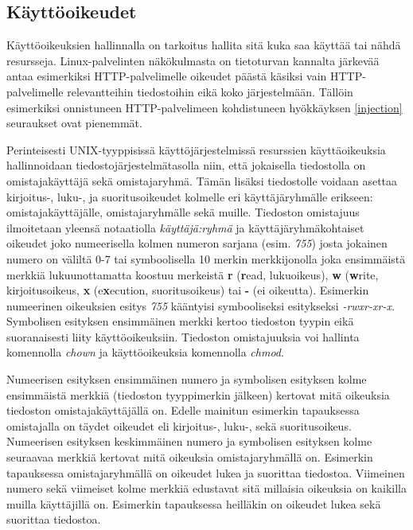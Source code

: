 \subsection{Käyttöoikeudet}\label{access_rights}
Käyttöoikeuksien hallinnalla on tarkoitus hallita sitä kuka saa käyttää tai nähdä resursseja. Linux-palvelinten näkökulmasta on tietoturvan kannalta järkevää antaa esimerkiksi HTTP-palvelimelle oikeudet päästä käsiksi vain HTTP-palvelimelle relevantteihin tiedostoihin eikä koko järjestelmään. Tällöin esimerkiksi onnistuneen HTTP-palvelimeen kohdistuneen hyökkäyksen \ref{injection} seuraukset ovat pienemmät.

Perinteisesti UNIX-tyyppisissä käyttöjärjestelmissä resurssien käyttäoikeuksia hallinnoidaan tiedostojärjestelmätasolla niin, että jokaisella tiedostolla on omistajakäyttäjä sekä omistajaryhmä. Tämän lisäksi tiedostolle voidaan asettaa kirjoitus-, luku-, ja suoritusoikeudet kolmelle eri käyttäjäryhmälle erikseen: omistajakäyttäjälle, omistajaryhmälle sekä muille. Tiedoston omistajuus ilmoitetaan yleensä notaatiolla \textit{käyttäjä:ryhmä} ja käyttäjäryhmäkohtaiset oikeudet joko numeerisella kolmen numeron sarjana (esim. \textit{755}) josta jokainen numero on väliltä 0-7 tai symboolisella 10 merkin merkkijonolla joka ensimmäistä merkkiä lukuunottamatta koostuu merkeistä \textbf{r} (\textbf{r}ead, lukuoikeus), \textbf{w} (\textbf{w}rite, kirjoitusoikeus, \textbf{x} (e\textbf{x}ecution, suoritusoikeus) tai \textbf{-} (ei oikeutta). Esimerkin numeerinen oikeuksien esitys \textit{755} kääntyisi symbooliseksi esitykseksi \textit{-rwxr-xr-x}. Symbolisen esityksen ensimmäinen merkki kertoo tiedoston tyypin eikä suoranaisesti liity käyttöoikeuksiin. Tiedoston omistajuuksia voi hallinta komennolla \textit{chown} ja käyttöoikeuksia komennolla \textit{chmod}.

Numeerisen esityksen ensimmäinen numero ja symbolisen esityksen kolme ensimmäistä merkkiä (tiedoston tyyppimerkin jälkeen) kertovat mitä oikeuksia tiedoston omistajakäyttäjällä on. Edelle mainitun esimerkin tapauksessa omistajalla on täydet oikeudet eli kirjoitus-, luku-, sekä suoritusoikeus. Numeerisen esityksen keskimmäinen numero ja symbolisen esityksen kolme seuraavaa merkkiä kertovat mitä oikeuksia omistajaryhmällä on. Esimerkin tapauksessa omistajaryhmällä on oikeudet lukea ja suorittaa tiedostoa. Viimeinen numero sekä viimeiset kolme merkkiä edustavat sitä millaisia oikeuksia on kaikilla muilla käyttäjillä on. Esimerkin tapauksessa heilläkin on oikeudet lukea sekä suorittaa tiedostoa.

